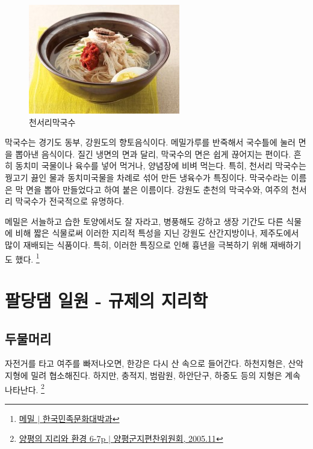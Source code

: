 \begin{figure}
    \centering
    \includegraphics[width=.6\textwidth]{img/막국수.jpg}
    \caption{천서리막국수\protect\footnotemark}
    \label{fig:my_labe71}
\end{figure}
\footnotetext{\href{https://terms.naver.com/entry.naver?docId=1627391&cid=48179&categoryId=48238}{[천서리막국수 $|$ 전통향토음식 용어사전}}




막국수는 경기도 동부, 강원도의 향토음식이다. 메밀가루를 반죽해서 국수틀에 눌러 면을 뽑아낸 음식이다.
질긴 냉면의 면과 달리, 막국수의 면은 쉽게 끊어지는 편이다.
흔히 동치미 국물이나 육수를 넣어 먹거나, 양념장에 비벼 먹는다.
특히, 천서리 막국수는 꿩고기 끓인 물과 동치미국물을 차례로 섞어 만든 냉육수가 특징이다.
막국수라는 이름은 막 면을 뽑아 만들었다고 하여 붙은 이름이다.
강원도 춘천의 막국수와, 여주의 천서리 막국수가 전국적으로 유명하다.


메밀은 서늘하고 습한 토양에서도 잘 자라고, 병풍해도 강하고 생장 기간도 다른 식물에 비해 짧은 식물로써
이러한 지리적 특성을 지닌 강원도 산간지방이나, 제주도에서 많이 재배되는 식품이다. 특히, 이러한 특징으로 인해
흉년을 극복하기 위해 재배하기도 했다.
\footnote{\href{https://terms.naver.com/entry.naver?docId=545707&cid=46640&categoryId=46640}{메밀 $|$ 한국민족문화대박과}}


\section{팔당댐 일원 - 규제의 지리학}
\subsection{두물머리}
자전거를 타고 여주를 빠저나오면, 한강은 다시 산 속으로 들어간다. 
하천지형은, 산악지형에 밀려 협소해진다. 하지만, 충적지, 범람원, 하안단구, 하중도 등의 지형은 계속 나타난다.
\footnote{\href{https://memory.library.kr/items/show/28910}{양평의 지리와 환경 6-7p $|$ 양평군지편찬위원회, 2005.11}}



